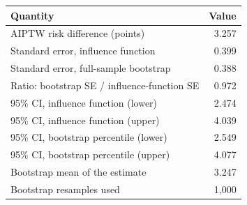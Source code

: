 {\small
\begin{tabular}{lr}
\toprule
Quantity & Value \\
\midrule
AIPTW risk difference (points) & 3.257 \\
Standard error, influence function & 0.399 \\
Standard error, full-sample bootstrap & 0.388 \\
Ratio: bootstrap SE / influence-function SE & 0.972 \\
95\% CI, influence function (lower) & 2.474 \\
95\% CI, influence function (upper) & 4.039 \\
95\% CI, bootstrap percentile (lower) & 2.549 \\
95\% CI, bootstrap percentile (upper) & 4.077 \\
Bootstrap mean of the estimate & 3.247 \\
Bootstrap resamples used & 1,000 \\
\bottomrule
\end{tabular}
}
